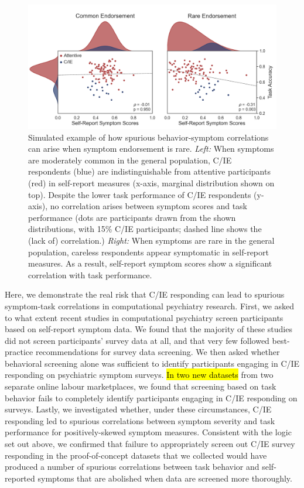\documentclass[a4paper,notitlepage,12pt]{article}
\begin{document}
\begin{refsection}[main]
\begin{figure}[t]
\includegraphics[width=16cm]{../figures/main_01.png}
\centering
\captionsetup{width=0.88\textwidth}
\caption{Simulated example of how spurious behavior-symptom correlations can arise when symptom endorsement is rare. \textit{Left:} When symptoms are moderately common in the general population, C/IE respondents (blue) are indistinguishable from attentive participants (red) in self-report measures (x-axis, marginal distribution shown on top). Despite the lower task performance of C/IE respondents (y-axis), no correlation arises between symptom scores and task performance (dots are participants drawn from the shown distributions, with 15\% C/IE participants; dashed line shows the (lack of) correlation.) \textit{Right:} When symptoms are rare in the general population, careless respondents appear symptomatic in self-report measures. As a result, self-report symptom scores show a significant correlation with task performance.}
\label{fig:simulation}
\end{figure}

Here, we demonstrate the real risk that C/IE responding can lead to spurious symptom-task correlations in computational psychiatry research. First, we asked to what extent recent studies in computational psychiatry screen participants based on self-report symptom data. We found that the majority of these studies did not screen participants' survey data at all, and that very few followed best-practice recommendations for survey data screening. We then asked whether behavioral screening alone was sufficient to identify participants engaging in C/IE responding on psychiatric symptom surveys. \hl{In two new datasets} from two separate online labour marketplaces, we found that screening based on task behavior fails to completely identify participants engaging in C/IE responding on surveys. Lastly, we investigated whether, under these circumstances, C/IE responding led to spurious correlations between symptom severity and task performance for positively-skewed symptom measures. Consistent with the logic set out above, we confirmed that failure to appropriately screen out C/IE survey responding in the proof-of-concept datasets that we collected would have produced a number of spurious correlations between task behavior and self-reported symptoms that are abolished when data are screened more thoroughly.


\end{refsection}
\end{document}
